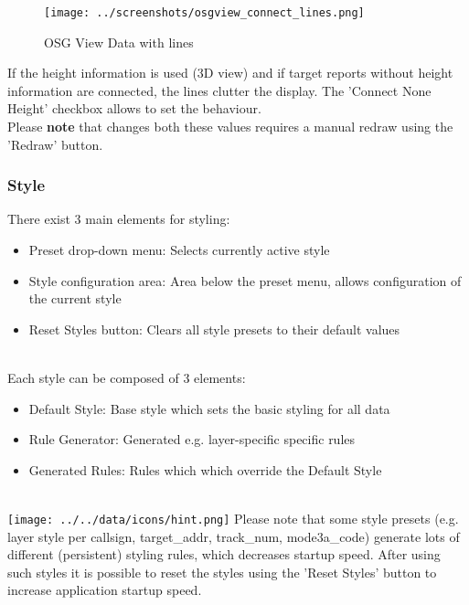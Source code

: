 \begin{figure}[H]
    \hspace*{-2.5cm}
    \texttt{[image: ../screenshots/osgview\_connect\_lines.png]}
  \caption{OSG View Data with lines}
\end{figure}

If the height information is used (3D view) and if target reports without height information are connected, the lines clutter the display. The 'Connect None Height' checkbox allows to set the behaviour. \\

Please \textbf{note} that changes both these values requires a manual redraw using the 'Redraw' button.

\subsubsection{Style}
\label{sec:style}

There exist 3 main elements for styling:
\begin{itemize}
 \item Preset drop-down menu: Selects currently active style
 \item Style configuration area: Area below the preset menu, allows configuration of the current style
 \item Reset Styles button: Clears all style presets to their default values
\end{itemize}
\  \\

Each style can be composed of 3 elements:
\begin{itemize}
 \item Default Style: Base style which sets the basic styling for all data
 \item Rule Generator: Generated e.g. layer-specific specific rules
 \item Generated Rules: Rules which which override the Default Style
\end{itemize}
\  \\

\texttt{[image: ../../data/icons/hint.png]} Please note that some style presets (e.g. layer style per callsign, target\_addr, track\_num, mode3a\_code) generate lots of different (persistent) styling rules, which decreases startup speed. After using such styles it is possible to reset the styles using the 'Reset Styles' button to increase application startup speed. \\


